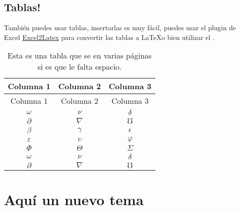 		
		
	\subsection{Tablas!}
		
		\newp También puedes usar tablas, insertarlas es muy fácil, puedes usar el plugin de Excel \href{https://www.ctan.org/tex-archive/support/excel2latex/}{Excel2Latex} para convertir las tablas a \LaTeX o bien utilizar el  \textsuperscript{\cite{ref3}}.
		
		\begin{longtable}{ccc}
			\caption{Esta es una tabla que se  en varias páginas si es que le falta espacio.}\label{tabl:foo}\\
			\hline
			Columna 1 & Columna 2 & Columna 3\\\hline
			\endfirsthead
			\hline
			Columna 1 & Columna 2 & Columna 3\\
			\hline
			\endhead
			\hline
			\endfoot
			\hline
			\endlastfoot
			$\omega$ & $\nu$ & $\delta$\\
			$\partial$ & $\nabla$ & $\mho$\\
			$\beta$ & $\gamma$ & $\epsilon$\\
			$\varepsilon$ & $\upsilon$ & $\varphi$\\
			$\Phi$ & $\Theta$ & $\varSigma$\\
			$\omega$ & $\nu$ & $\delta$\\
			$\partial$ & $\nabla$ & $\mho$\\
		\end{longtable}


\section{Aquí un nuevo tema}
	
